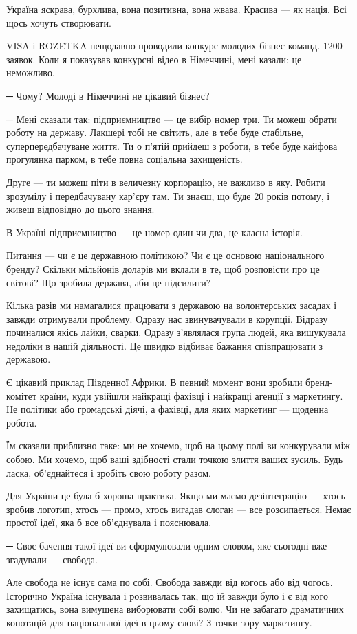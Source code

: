 Україна яскрава, бурхлива, вона позитивна, вона жвава. Красива --- як нація. Всі
щось хочуть створювати. 

VISA і ROZETKA нещодавно проводили конкурс молодих бізнес-команд. 1200 заявок.
Коли я показував конкурсні відео в Німеччині, мені казали: це неможливо.

─ Чому? Молоді в Німеччині не цікавий бізнес?

─ Мені сказали так: підприємництво --- це вибір номер три. Ти можеш обрати роботу
на державу. Лакшері тобі не світить, але в тебе буде стабільне,
суперпередбачуване життя. Ти о п’ятій прийдеш з роботи, в тебе буде кайфова
прогулянка парком, в тебе повна соціальна захищеність.

Друге --- ти можеш піти в величезну корпорацію, не важливо в яку. Робити
зрозумілу і передбачувану кар’єру там. Ти знаєш, що буде 20 років потому, і
живеш відповідно до цього знання.

В Україні підприємництво --- це номер один чи два, це класна історія.

Питання --- чи є це державною політикою? Чи є це основою національного бренду?
Скільки мільйонів доларів ми вклали в те, щоб розповісти про це світові? Що
зробила держава, аби це підсилити?

Кілька разів ми намагалися працювати з державою на волонтерських засадах і
завжди отримували проблему. Одразу нас звинувачували в корупції. Відразу
починалися якісь лайки, сварки. Одразу з’являлася група людей, яка вишукувала
недоліки в нашій діяльності. Це швидко відбиває бажання співпрацювати з
державою.

Є цікавий приклад Південної Африки. В певний момент вони зробили бренд-комітет
країни, куди увійшли найкращі фахівці і найкращі агенції з маркетингу. Не
політики або громадські діячі, а фахівці, для яких маркетинг --- щоденна робота. 

Їм сказали приблизно таке: ми не хочемо, щоб на цьому полі ви конкурували між
собою. Ми хочемо, щоб ваші здібності стали точкою злиття ваших зусиль. Будь
ласка, об’єднайтеся і зробіть свою роботу разом.

Для України це була б хороша практика. Якщо ми маємо дезінтеграцію --- хтось
зробив логотип, хтось --- промо, хтось вигадав слоган --- все розсипається. Немає
простої ідеї, яка б все об’єднувала і пояснювала.

─ Своє бачення такої ідеї ви сформулювали одним словом, яке сьогодні вже
згадували --- свобода. 

Але свобода не існує сама по собі. Свобода завжди від когось або від чогось.
Історично Україна існувала і розвивалась так, що їй завжди було і є від кого
захищатись, вона вимушена виборювати собі волю. Чи не забагато драматичних
конотацій для національної ідеї в цьому слові? З точки зору маркетингу.

